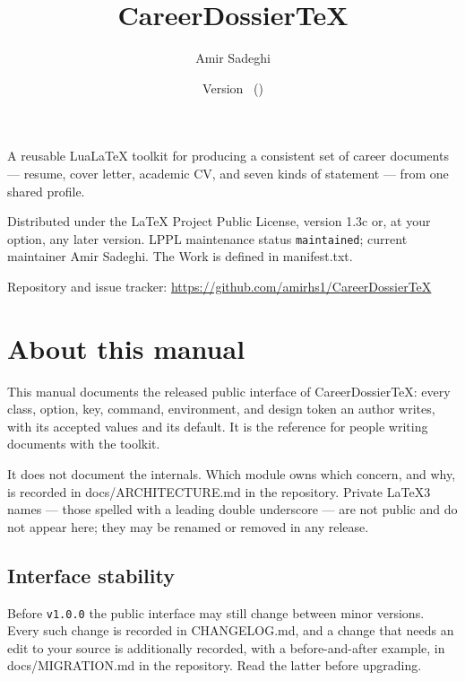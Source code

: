 \documentclass[11pt]{article}
\title{\sffamily\bfseries CareerDossierTeX}
\author{Amir Sadeghi}
\date{Version \CDossierManualVersion\ (\CDossierManualDate)}
\makeatletter
\newif\ifcd@firstchar
\newcommand{\cd@breaklong}[1]{%
  \cd@firstchartrue
  \@tfor\cd@char:=#1\do{\expandafter\cd@testchar\cd@char}}
\newcommand{\cd@testchar}[1]{%
  \ifcd@firstchar
    \cd@firstcharfalse
  \else
    \ifnum\uccode`#1=`#1 \allowbreak\fi
  \fi
  #1%
  \ifnum0\if#1-1\fi\if#1/1\fi\if#1.1\fi>0 \allowbreak\fi}
\DeclareRobustCommand{\file}[1]{\texttt{\cd@breaklong{#1}}}
\def\file#1{#1}%
\makeatother
\begin{document}
\maketitle

\begin{center}
\begin{minipage}{0.86\textwidth}
\small
A reusable LuaLaTeX toolkit for producing a consistent set of career documents
--- resume, cover letter, academic CV, and seven kinds of statement --- from one
shared profile.

Distributed under the \LaTeX{} Project Public License, version 1.3c or, at your
option, any later version. LPPL maintenance status \texttt{maintained}; current
maintainer Amir Sadeghi. The Work is defined in \file{manifest.txt}.

Repository and issue tracker:
\url{https://github.com/amirhs1/CareerDossierTeX}
\end{minipage}
\end{center}

\vspace{1.5\baselineskip}

\tableofcontents

\clearpage

\section{About this manual}

This manual documents the released public interface of CareerDossierTeX: every
class, option, key, command, environment, and design token an author writes,
with its accepted values and its default. It is the reference for people writing
documents with the toolkit.

It does not document the internals. Which module owns which concern, and why, is
recorded in \file{docs/ARCHITECTURE.md} in the repository. Private \LaTeX3 names
--- those spelled with a leading double underscore --- are not public and do not
appear here; they may be renamed or removed in any release.

\subsection{Interface stability}

Before \texttt{v1.0.0} the public interface may still change between minor
versions. Every such change is recorded in \file{CHANGELOG.md}, and a change
that needs an edit to your source is additionally recorded, with a before-and-after
example, in \file{docs/MIGRATION.md} in the repository. Read the latter before
upgrading.
\end{document}
